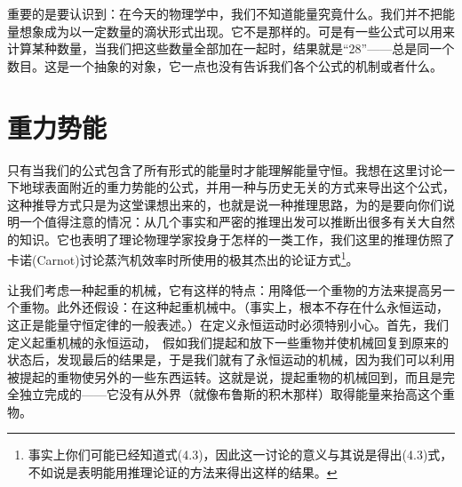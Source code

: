 \documentclass[12pt,oneside]{book}
\begin{document}
\begin{common-format}
重要的是要认识到：在今天的物理学中，我们不知道能量究竟什么。我们并不把能量想象成为以一定数量的滴状形式出现。它不是那样的。可是有一些公式可以用来计算某种数量，当我们把这些数量全部加在一起时，结果就是“28”——总是同一个数目。这是一个抽象的对象，它一点也没有告诉我们各个公式的机制或者什么。


\section{重力势能}
只有当我们的公式包含了所有形式的能量时才能理解能量守恒。我想在这里讨论一下地球表面附近的重力势能的公式，并用一种与历史无关的方式来导出这个公式，这种推导方式只是为这堂课想出来的，也就是说一种推理思路，为的是要向你们说明一个值得注意的情况：从几个事实和严密的推理出发可以推断出很多有关大自然的知识。它也表明了理论物理学家投身于怎样的一类工作，我们这里的推理仿照了卡诺(Carnot)讨论蒸汽机效率时所使用的极其杰出的论证方式\footnote{事实上你们可能已经知道式(4.3)，因此这一讨论的意义与其说是得出(4.3)式，不如说是表明能用推理论证的方法来得出这样的结果。}。

让我们考虑一种起重的机械，它有这样的特点：用降低一个重物的方法来提高另一个重物。此外还假设：在这种起重机械中。（事实上，根本不存在什么永恒运动，这正是能量守恒定律的一般表述。）在定义永恒运动时必须特别小心。首先，我们定义起重机械的永恒运动，　假如我们提起和放下一些重物并使机械回复到原来的状态后，发现最后的结果是，于是我们就有了永恒运动的机械，因为我们可以利用被提起的重物使另外的一些东西运转。这就是说，提起重物的机械回到，而且是完全独立完成的——它没有从外界（就像布鲁斯的积木那样）取得能量来抬高这个重物。


\end{common-format}
\end{document}
